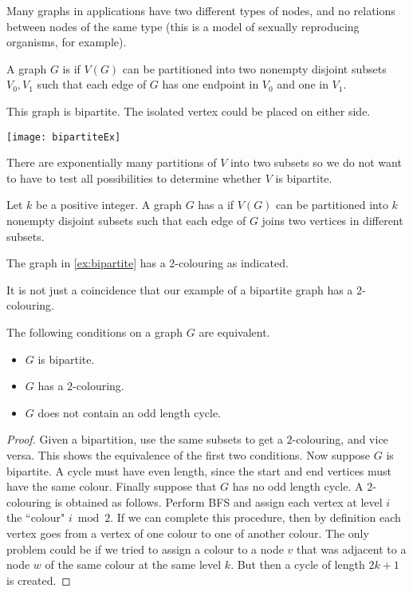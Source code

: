 Many graphs in applications have two different types of nodes, and no
relations between nodes of the same type (this is a model of sexually
reproducing organisms, for example).

\begin{Definition}
A graph $G$ is  if $V(G)$  can be partitioned into
two nonempty disjoint subsets $V_0, V_1$ such that each edge of $G$
has one endpoint in $V_0$ and one in $V_1$.
\end{Definition}

\begin{Boxample} \label{ex:bipartite}
This graph is bipartite.  
The isolated vertex could be placed on either side.
\begin{center}
\texttt{[image: bipartiteEx]} 
\end{center}
\end{Boxample}

There are exponentially many partitions of $V$ into two subsets so we
do not want to have to test all possibilities to determine whether $V$ is bipartite.

\begin{Definition}
Let $k$ be a positive integer. A graph $G$ has a 
if $V(G)$ can be partitioned into $k$ nonempty disjoint subsets such
that each edge of $G$ joins two vertices in different subsets.
\end{Definition}

\begin{Example}
The graph in \cref{ex:bipartite} has a 2-colouring as indicated.
\end{Example}

It is not just a coincidence that our example of a bipartite graph
has a 2-colouring.

\begin{Theorem} 
The following conditions on a graph $G$ are equivalent.
\begin{itemize}
  \item $G$ is bipartite.
  \item $G$ has a $2$-colouring.
  \item $G$ does not contain an odd length cycle.
\end{itemize}
\end{Theorem}
\begin{proof} 
Given a bipartition, use the same subsets to get a $2$-colouring, and
vice versa. This shows the equivalence of the first two conditions. Now
suppose $G$ is bipartite.  A cycle must have even length, since the start
and end vertices must have the same colour. Finally suppose that $G$
has no odd length cycle. A $2$-colouring is obtained as follows. Perform
BFS and assign each vertex at level $i$ the ``colour" $i \bmod 2$. If we
can complete this procedure, then by definition each vertex goes from
a vertex of one colour to one of another colour. The only problem could
be if we tried to assign a colour to a node $v$ that was adjacent to a
node $w$ of the same colour at the same level $k$. But then a cycle of
length $2k+1$ is created.
\end{proof}

